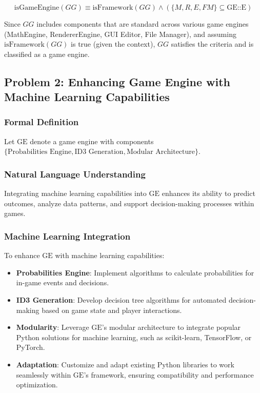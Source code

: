 \[
\text{isGameEngine}(GG) \equiv \text{isFramework}(GG) \land (\{ M, R, E, FM \} \subseteq \text{GE::E})
\]

Since \( GG \) includes components that are standard across various game engines (MathEngine, RendererEngine, GUI Editor, File Manager), and assuming \( \text{isFramework}(GG) \) is true (given the context), \( GG \) satisfies the criteria and is classified as a game engine.

\pagebreak



\subsection*{Problem 2: Enhancing Game Engine with Machine Learning Capabilities}

\subsubsection*{Formal Definition}
Let \( \text{GE} \) denote a game engine with components \( \{ \text{Probabilities Engine}, \text{ID3 Generation}, \text{Modular Architecture} \} \).

\subsubsection*{Natural Language Understanding}
Integrating machine learning capabilities into \( \text{GE} \) enhances its ability to predict outcomes, analyze data patterns, and support decision-making processes within games.

\subsubsection*{Machine Learning Integration}
To enhance \( \text{GE} \) with machine learning capabilities:
\begin{itemize}
    \item \textbf{Probabilities Engine}: Implement algorithms to calculate probabilities for in-game events and decisions.
    \item \textbf{ID3 Generation}: Develop decision tree algorithms for automated decision-making based on game state and player interactions.
    \item \textbf{Modularity}: Leverage \( \text{GE} \)'s modular architecture to integrate popular Python solutions for machine learning, such as scikit-learn, TensorFlow, or PyTorch.
    \item \textbf{Adaptation}: Customize and adapt existing Python libraries to work seamlessly within \( \text{GE} \)'s framework, ensuring compatibility and performance optimization.
\end{itemize}


